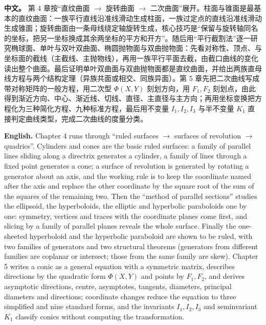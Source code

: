 \documentclass[UTF8,11pt,a4paper]{ctexart}
\newcommand{\APS}[2]{\par\noindent\textbf{中文。} #1\par\noindent\textbf{English.} #2\par\smallskip}
\theoremstyle{definition}
\begin{document}
\APS{第 4 章按``直纹曲面 $\to$ 旋转曲面 $\to$ 二次曲面''展开。柱面与锥面是最基本的直纹曲面：一族平行直线沿准线滑动生成柱面，一族过定点的直线沿准线滑动生成锥面；旋转曲面由一条母线绕定轴旋转生成，核心技巧是``保留与旋转轴同名的坐标，把另一坐标换成其余两坐标的平方和开方''。随后用``平行截割法''逐一研究椭球面、单叶与双叶双曲面、椭圆抛物面与双曲抛物面：先看对称性、顶点、与坐标面的截线（主截线、主抛物线），再用一族平行平面去截，由截口曲线的变化读出整个曲面。最后证明单叶双曲面与双曲抛物面都是直纹曲面，并给出两族直母线方程与两个结构定理（异族共面或相交、同族异面）。第 5 章先把二次曲线写成带对称矩阵的一般方程，用二次型 $\Phi(X,Y)$ 刻划方向，用 $F_1,F_2$ 刻划点，由此得到渐近方向、中心、渐近线、切线、直径、主直径与主方向；再用坐标变换把方程化为三种简化方程、九种标准方程，最后用不变量 $I_1,I_2,I_3$ 与半不变量 $K_1$ 直接判定曲线类型，完成二次曲线的度量分类。}{Chapter 4 runs through ``ruled surfaces $\to$ surfaces of revolution $\to$ quadrics''. Cylinders and cones are the basic ruled surfaces: a family of parallel lines sliding along a directrix generates a cylinder, a family of lines through a fixed point generates a cone; a surface of revolution is generated by rotating a generator about an axis, and the working rule is to keep the coordinate named after the axis and replace the other coordinate by the square root of the sum of the squares of the remaining two. Then the ``method of parallel sections'' studies the ellipsoid, the hyperboloids, the elliptic and hyperbolic paraboloids one by one: symmetry, vertices and traces with the coordinate planes come first, and slicing by a family of parallel planes reveals the whole surface. Finally the one-sheeted hyperboloid and the hyperbolic paraboloid are shown to be ruled, with two families of generators and two structural theorems (generators from different families are coplanar or intersect; those from the same family are skew). Chapter 5 writes a conic as a general equation with a symmetric matrix, describes directions by the quadratic form $\Phi(X,Y)$ and points by $F_1,F_2$, and derives asymptotic directions, centre, asymptotes, tangents, diameters, principal diameters and directions; coordinate changes reduce the equation to three simplified and nine standard forms, and the invariants $I_1,I_2,I_3$ and seminvariant $K_1$ classify conics without computing the transformation.}
\end{document}
